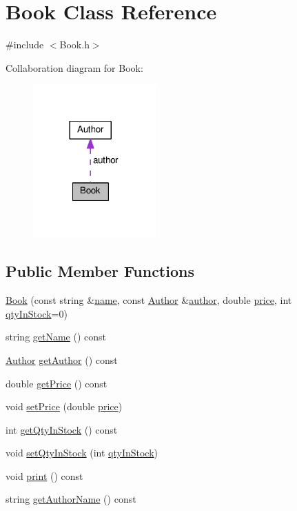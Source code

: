 \hypertarget{classBook}{}\section{Book Class Reference}
\label{classBook}


{\ttfamily \#include $<$Book.\+h$>$}



Collaboration diagram for Book\+:
\nopagebreak
\begin{figure}[H]
\begin{center}
\leavevmode
\includegraphics[width=134pt]{classBook__coll__graph}
\end{center}
\end{figure}
\subsection*{Public Member Functions}
\begin{DoxyCompactItemize}
\item 
\hyperlink{classBook_aeaaa3bc96a448032baf5aef373a81d4c}{Book} (const string \&\hyperlink{classBook_a9afedb80b692466dc2d91f109970a32c}{name}, const \hyperlink{classAuthor}{Author} \&\hyperlink{classBook_a1c84f2a0d3db51a0c65f061c91096053}{author}, double \hyperlink{classBook_afa8e149d0bfb4372166d0ccfe8aa30b7}{price}, int \hyperlink{classBook_ae828efa39fa83ff5a8dc3c66e78454e2}{qty\+In\+Stock}=0)
\item 
string \hyperlink{classBook_a1805804b65b05f85adaf94955989e5d0}{get\+Name} () const 
\item 
\hyperlink{classAuthor}{Author} \hyperlink{classBook_a81bfb916599a88e566ebb23162a8c557}{get\+Author} () const 
\item 
double \hyperlink{classBook_a3a3c43b4ab227b3eecba9e414d36c236}{get\+Price} () const 
\item 
void \hyperlink{classBook_a087155b5ee84047d6775b564b92b1778}{set\+Price} (double \hyperlink{classBook_afa8e149d0bfb4372166d0ccfe8aa30b7}{price})
\item 
int \hyperlink{classBook_a123d03e3061f580fefba69b16004954c}{get\+Qty\+In\+Stock} () const 
\item 
void \hyperlink{classBook_ae719f6e8595788d4a6d4126ad073a465}{set\+Qty\+In\+Stock} (int \hyperlink{classBook_ae828efa39fa83ff5a8dc3c66e78454e2}{qty\+In\+Stock})
\item 
void \hyperlink{classBook_a1560f1015348a6d404d1ac069bead1a2}{print} () const 
\item 
string \hyperlink{classBook_ae152ba70b32871377378adf8e87a91ea}{get\+Author\+Name} () const 
\end{DoxyCompactItemize}
